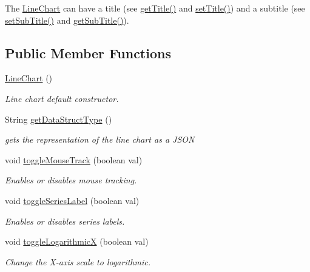 The \hyperlink{classbridges_1_1base_1_1_line_chart}{Line\+Chart} can have a title (see \hyperlink{classbridges_1_1base_1_1_line_chart_aedc5f75b158298b755ba0c31bcf84138}{get\+Title()} and \hyperlink{classbridges_1_1base_1_1_line_chart_a893519da804666988c49b918c87da2a2}{set\+Title()}) and a subtitle (see \hyperlink{classbridges_1_1base_1_1_line_chart_ad24bfdd49194f8e152fdb80e039762ad}{set\+Sub\+Title()} and \hyperlink{classbridges_1_1base_1_1_line_chart_a102006e90f2a226886538db0eeda6b08}{get\+Sub\+Title()}). \subsection*{Public Member Functions}
\begin{DoxyCompactItemize}
\item 
\hyperlink{classbridges_1_1base_1_1_line_chart_ae864fe5ae85e80ae2f035471fb216e68}{Line\+Chart} ()
\begin{DoxyCompactList}\small\item\em Line chart default constructor. \end{DoxyCompactList}\item 
String \hyperlink{classbridges_1_1base_1_1_line_chart_ae5d7ebffc6f29256f6fff368ef9a6c84}{get\+Data\+Struct\+Type} ()
\begin{DoxyCompactList}\small\item\em gets the representation of the line chart as a J\+S\+ON \end{DoxyCompactList}\item 
void \hyperlink{classbridges_1_1base_1_1_line_chart_a095d16c1544cf373b8d2bf68ca864bd9}{toggle\+Mouse\+Track} (boolean val)
\begin{DoxyCompactList}\small\item\em Enables or disables mouse tracking. \end{DoxyCompactList}\item 
void \hyperlink{classbridges_1_1base_1_1_line_chart_adae74cfb09585727a96cf74ddf74d098}{toggle\+Series\+Label} (boolean val)
\begin{DoxyCompactList}\small\item\em Enables or disables series labels. \end{DoxyCompactList}\item 
void \hyperlink{classbridges_1_1base_1_1_line_chart_ad3e5e54c382ac605a81b6b61c250ad16}{toggle\+LogarithmicX} (boolean val)
\begin{DoxyCompactList}\small\item\em Change the X-\/axis scale to logarithmic. \end{DoxyCompactList}\item 

\end{DoxyCompactItemize}
